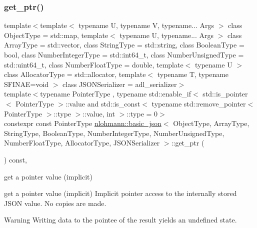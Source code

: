 \subsubsection{\texorpdfstring{get\_ptr()}{get\_ptr()}\hspace{0.1cm}{\footnotesize\ttfamily [2/2]}}
{\footnotesize\ttfamily template$<$template$<$ typename U, typename V, typename... Args $>$ class Object\+Type = std\+::map, template$<$ typename U, typename... Args $>$ class Array\+Type = std\+::vector, class String\+Type  = std\+::string, class Boolean\+Type  = bool, class Number\+Integer\+Type  = std\+::int64\+\_\+t, class Number\+Unsigned\+Type  = std\+::uint64\+\_\+t, class Number\+Float\+Type  = double, template$<$ typename U $>$ class Allocator\+Type = std\+::allocator, template$<$ typename T, typename S\+F\+I\+N\+A\+E=void $>$ class J\+S\+O\+N\+Serializer = adl\+\_\+serializer$>$ \\
template$<$typename Pointer\+Type , typename std\+::enable\+\_\+if$<$ std\+::is\+\_\+pointer$<$ Pointer\+Type $>$\+::value and std\+::is\+\_\+const$<$ typename std\+::remove\+\_\+pointer$<$ Pointer\+Type $>$\+::type $>$\+::value, int $>$\+::type  = 0$>$ \\
constexpr const Pointer\+Type \mbox{\hyperlink{classnlohmann_1_1basic__json}{nlohmann\+::basic\+\_\+json}}$<$ Object\+Type, Array\+Type, String\+Type, Boolean\+Type, Number\+Integer\+Type, Number\+Unsigned\+Type, Number\+Float\+Type, Allocator\+Type, J\+S\+O\+N\+Serializer $>$\+::get\+\_\+ptr (\begin{DoxyParamCaption}{ }\end{DoxyParamCaption}) const\hspace{0.3cm}{\ttfamily [inline]}, {\ttfamily [noexcept]}}



get a pointer value (implicit) 

get a pointer value (implicit) Implicit pointer access to the internally stored J\+S\+ON value. No copies are made.

\begin{DoxyWarning}{Warning}
Writing data to the pointee of the result yields an undefined state.
\end{DoxyWarning}


